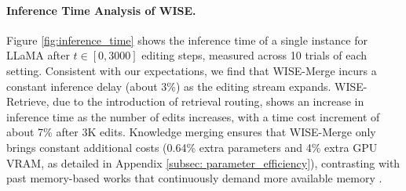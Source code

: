 \paragraph{Inference Time Analysis of WISE.} 
Figure \ref{fig:inference_time} shows the inference time of a single instance for LLaMA after $t \in [0, 3000]$ editing steps, measured across 10 trials of each setting. 
Consistent with our expectations, we find that WISE-Merge incurs a constant inference delay (about 3\%) as the editing stream expands.
WISE-Retrieve, due to the introduction of retrieval routing, shows an increase in inference time as the number of edits increases, with a time cost increment of about 7\% after 3K edits.
Knowledge merging ensures that WISE-Merge only brings constant additional costs (0.64\% extra parameters and 4\% extra GPU VRAM, as detailed in Appendix \ref{subsec: parameter_efficiency}), contrasting with past memory-based works that continuously demand more available memory \cite{grace, serac}.
